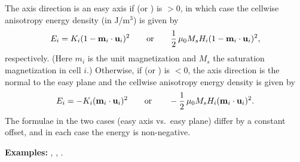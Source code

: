 \begin{itemize}
\begin{description}
  The axis direction is an easy axis if  (or )
  is $>$0, in which case the cellwise anisotropy energy density (in
  J/m${}^3$) is given by
   \begin{displaymath}
         E_i = K_i(1 - \textbf{m}_i\cdot\textbf{u}_i)^2 \qquad \mbox{or} \qquad
               \frac{1}{2}\, \mu_0 M_s H_i (1 - \textbf{m}_i\cdot\textbf{u}_i)^2,
   \end{displaymath}
  respectively.  (Here $m_i$ is the unit magnetization and $M_s$ the
  saturation magnetization in cell $i$.)  Otherwise, if 
  (or ) is $<0$, the axis direction is the normal to the
  easy plane and the cellwise anisotropy energy density is given by
   \begin{displaymath}
         E_i = -K_i(\textbf{m}_i\cdot\textbf{u}_i)^2 \qquad \mbox{or} \qquad
               -\frac{1}{2}\, \mu_0 M_s H_i (\textbf{m}_i\cdot\textbf{u}_i)^2.
   \end{displaymath}
  The formulae in the two cases (easy axis vs.\ easy plane) differ by a
  constant offset, and in each case the energy is non-negative.

\textbf{Examples:} , , .


\end{description}
\end{itemize}
